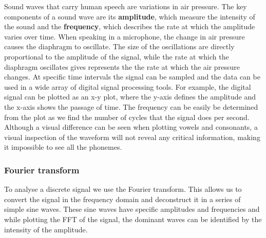Sound waves that carry human speech are variations in air pressure. The key components of a sound wave are its \textbf{amplitude}, which measure the intensity of the sound and the \textbf{frequency}, which describes the rate at which the amplitude varies over time. When speaking in a microphone, the change in air pressure causes the diaphragm to oscillate. The size of the oscillations are directly proportional to the amplitude of the signal, while the rate at which the diaphragm oscillates gives represents the the rate at which the air pressure changes. At specific time intervals the signal can be sampled and the data can be used in a wide array of digital signal processing tools. For example, the digital signal can be plotted as an x-y plot, where the y-axis defines the amplitude and the x-axis shows the passage of time. The frequency can be easily be determined from the plot as we find the number of cycles that the signal does per second.\\

Although a visual difference can be seen when plotting vowels and consonants, a visual inspection of the waveform will not reveal any critical information, making it impossible to see all the phonemes.\\

\subsubsection{ Fourier transform}

To analyse a discrete signal we use the Fourier transform. This allows us to convert the signal in the frequency domain and deconstruct it in a series of simple sine waves. These sine waves have specific amplitudes and frequencies and while plotting the FFT of the signal, the dominant waves can be identified by the intensity of the amplitude.